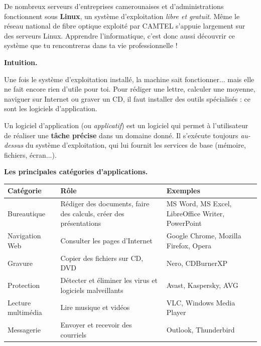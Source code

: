 \documentclass[11pt]{article}
\newcommand{\cle}[1]{{\popxbold\color{popdark}#1}}
\newcounter{popsec}
\newcounter{popsub}
\newcommand{\courssub}[1]{%
  \stepcounter{popsub}%
  \par\vspace{9pt}\noindent{\popxbold\fontsize{11.5}{13}\selectfont\color{popink}{\color{poporange}\thepopsec.\thepopsub}\hspace{6pt}#1}\par\nopagebreak\vspace{4pt}
}
\begin{document}
\begin{savaistu}
De nombreux serveurs d'entreprises camerounaises et d'administrations fonctionnent sous \textbf{Linux}, un système d'exploitation \emph{libre et gratuit}. Même le réseau national de fibre optique exploité par CAMTEL s'appuie largement sur des serveurs Linux. Apprendre l'informatique, c'est donc aussi découvrir ce système que tu rencontreras dans ta vie professionnelle !
\end{savaistu}

\courssub{Les logiciels d'application}

\textbf{Intuition.}\par
Une fois le système d'exploitation installé, la machine sait fonctionner... mais elle ne fait encore rien d'utile pour toi. Pour rédiger une lettre, calculer une moyenne, naviguer sur Internet ou graver un CD, il faut installer des outils spécialisés : ce sont les logiciels d'application.

\begin{definition}
Un \cle{logiciel d'application} (ou \emph{applicatif}) est un logiciel qui permet à l'utilisateur de réaliser une \textbf{tâche précise} dans un domaine donné. Il s'exécute toujours \emph{au-dessus} du système d'exploitation, qui lui fournit les services de base (mémoire, fichiers, écran...).
\end{definition}

\textbf{Les principales catégories d'applications.}

\begin{center}
\begin{tabularx}{\linewidth}{|l|X|X|}
\hline
\rowcolor{popblueL} \textbf{Catégorie} & \textbf{Rôle} & \textbf{Exemples} \\
\hline
Bureautique & Rédiger des documents, faire des calculs, créer des présentations & MS Word, MS Excel, LibreOffice Writer, PowerPoint \\
\hline
Navigation Web & Consulter les pages d'Internet & Google Chrome, Mozilla Firefox, Opera \\
\hline
Gravure & Copier des fichiers sur CD, DVD & Nero, CDBurnerXP \\
\hline
Protection & Détecter et éliminer les virus et logiciels malveillants & Avast, Kaspersky, AVG \\
\hline
Lecture multimédia & Lire musique et vidéos & VLC, Windows Media Player \\
\hline
Messagerie & Envoyer et recevoir des courriels & Outlook, Thunderbird \\
\hline
\end{tabularx}
\end{center}
\end{document}
